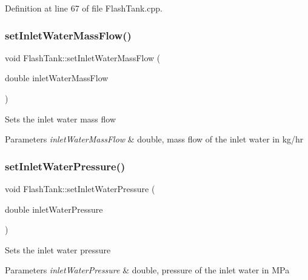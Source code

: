 Definition at line 67 of file Flash\+Tank.\+cpp.

\mbox{\label{class_flash_tank_a2bcbd92d39ef3c760bdd65066ba3d34a}} 
\subsubsection{\texorpdfstring{set\+Inlet\+Water\+Mass\+Flow()}{setInletWaterMassFlow()}\hspace{0.1cm}{\footnotesize\ttfamily [3/3]}}
{\footnotesize\ttfamily void Flash\+Tank\+::set\+Inlet\+Water\+Mass\+Flow (\begin{DoxyParamCaption}\item[{double}]{inlet\+Water\+Mass\+Flow }\end{DoxyParamCaption})}

Sets the inlet water mass flow 
\begin{DoxyParams}{Parameters}
{\em inlet\+Water\+Mass\+Flow} & double, mass flow of the inlet water in kg/hr \\
\hline
\end{DoxyParams}
\mbox{\label{class_flash_tank_aed0991a7902401d110fb2f4b472326f5}} 
\subsubsection{\texorpdfstring{set\+Inlet\+Water\+Pressure()}{setInletWaterPressure()}\hspace{0.1cm}{\footnotesize\ttfamily [1/3]}}
{\footnotesize\ttfamily void Flash\+Tank\+::set\+Inlet\+Water\+Pressure (\begin{DoxyParamCaption}\item[{double}]{inlet\+Water\+Pressure }\end{DoxyParamCaption})}

Sets the inlet water pressure 
\begin{DoxyParams}{Parameters}
{\em inlet\+Water\+Pressure} & double, pressure of the inlet water in M\+Pa \\
\hline
\end{DoxyParams}
\mbox{\label{class_flash_tank_aed0991a7902401d110fb2f4b472326f5}} 
